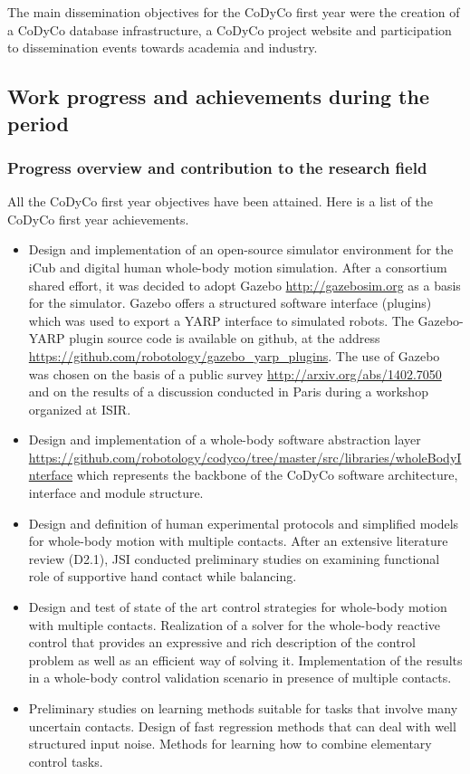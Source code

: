 \documentclass[12pt,a4paper,twoside]{article}
\begin{document}
The main dissemination objectives for the CoDyCo first year were the creation of a CoDyCo database infrastructure, a CoDyCo project website and participation to dissemination events towards academia and industry. 

\subsection{Work progress and achievements during the period}

\subsubsection{Progress overview and contribution to the research field}

All the CoDyCo first year objectives have been attained. Here is a list of the CoDyCo first year achievements. 
\begin{itemize}

\item Design and implementation of an open-source simulator environment for the iCub and digital human whole-body motion simulation. After a consortium shared effort, it was decided to adopt Gazebo \url{http://gazebosim.org} as a basis for the simulator. Gazebo offers a structured software interface (plugins) which was used to export a YARP interface to simulated robots. The Gazebo-YARP plugin source code is available on github, at the address \url{https://github.com/robotology/gazebo_yarp_plugins}. The use of Gazebo was chosen on the basis of a public survey \url{http://arxiv.org/abs/1402.7050} and on the results of a discussion conducted in Paris during a workshop organized at ISIR.

\item Design and implementation of a whole-body software abstraction layer \url{https://github.com/robotology/codyco/tree/master/src/libraries/wholeBodyInterface} which represents the backbone of the CoDyCo software architecture, interface and module structure.

\item Design and definition of human experimental protocols and simplified models for whole-body motion with multiple contacts. After an extensive literature review (D2.1), JSI conducted preliminary studies on examining functional role of supportive hand contact while balancing.

\item Design and test of state of the art control strategies for whole-body motion with multiple contacts. Realization of a solver for the whole-body reactive control that provides an expressive and rich description of the control problem as well as an efficient way of solving it. Implementation of the results in a whole-body control validation scenario in presence of multiple contacts. 

\item Preliminary studies on learning methods suitable for tasks that involve many uncertain contacts. Design of fast regression methods that can deal with well structured input noise. Methods for learning how to combine elementary control tasks.

\end{itemize}
\end{document}
